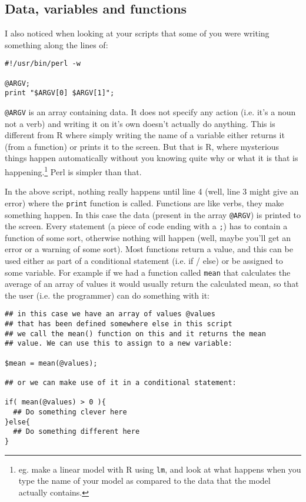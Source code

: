 \documentclass[11pt]{article}
\renewcommand\scriptsize\normalsize
\begin{document}
\subsection{Data, variables and functions}
\label{sec-1-2}
I also noticed when looking at your scripts that some of you were writing something along the lines of:

\begin{verbatim}
#!/usr/bin/perl -w

@ARGV;
print "$ARGV[0] $ARGV[1]";
\end{verbatim}

\texttt{@ARGV} is an array containing data. It does not specify any action (i.e. it's a noun
not a verb) and writing it on it's own doesn't actually do anything. This is different from
R where simply writing the name of a variable either returns it (from a function) or prints
it to the screen. But that is R, where mysterious things happen automatically without you
knowing quite why or what it is that is happening.\footnote{eg. make a linear model with
R using \texttt{lm}, and look at what happens when you type the name of your model as
compared to the data that the model actually contains.} Perl is simpler than that.

In the above script, nothing really happens until line 4 (well, line 3 might give an
error) where the \texttt{print} function is called. Functions are like verbs, they
make something happen. In this case the data (present in the array \texttt{@ARGV})
is printed to the screen. Every statement (a piece of code ending with a \texttt{;})
has to contain a function of some sort, otherwise nothing will happen (well, maybe
you'll get an error or a warning of some sort). Most functions return a value, and
this can be used either as part of a conditional statement (i.e. if / else)
or be assigned to some variable. For example if we had a function called \texttt{mean}
that calculates the average of an array of values it would usually return the
calculated mean, so that the user (i.e. the programmer) can do something with it:

\begin{verbatim}
## in this case we have an array of values @values
## that has been defined somewhere else in this script
## we call the mean() function on this and it returns the mean
## value. We can use this to assign to a new variable:

$mean = mean(@values);

## or we can make use of it in a conditional statement:

if( mean(@values) > 0 ){
  ## Do something clever here
}else{
  ## Do something different here
}
\end{verbatim}
\end{document}
